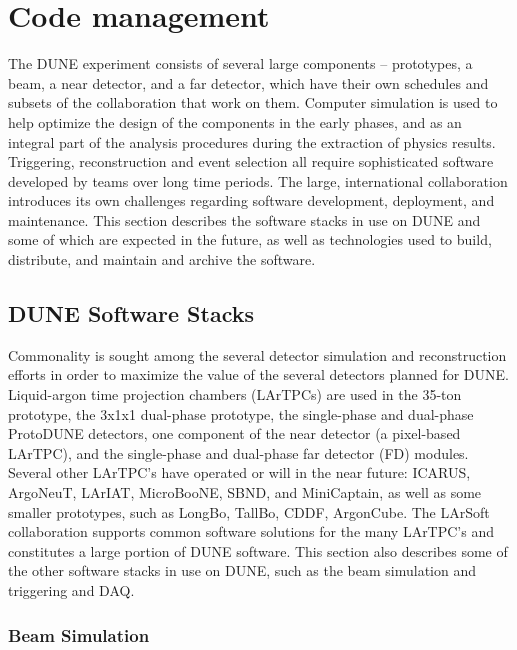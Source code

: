 %

\chapter{Code management} %
The DUNE experiment consists of several large components -- prototypes, a beam, a near detector, and a far detector,
which have their own schedules and subsets of the collaboration that work on them.  Computer simulation is used to
help optimize the design of the components in the early phases, and as an integral part of the analysis procedures
during the extraction of physics results.  Triggering, reconstruction and event selection all require sophisticated
software developed by teams over long time periods.  The large, international
collaboration introduces its own challenges regarding software development, deployment, and maintenance.
This section describes the software stacks in use on DUNE and some of which are expected in the future,
as well as technologies used to build, distribute, and maintain and archive the software.

\section{DUNE Software Stacks}

Commonality is sought among the several detector simulation and reconstruction efforts in order to maximize the
value of the several detectors planned for DUNE.  Liquid-argon time projection chambers (LArTPCs) are used in the 35-ton
prototype, the 3x1x1 dual-phase prototype, the single-phase and dual-phase ProtoDUNE detectors, 
one component of the near detector (a pixel-based
LArTPC), and the single-phase and dual-phase far detector (FD) modules.  Several other LArTPC's have operated or will
in the near future:  ICARUS, ArgoNeuT, LArIAT, MicroBooNE, SBND, and MiniCaptain, as well as some smaller prototypes,
such as LongBo, TallBo, CDDF, ArgonCube.  The LArSoft collaboration supports common software solutions for the
many LArTPC's and constitutes a large portion of DUNE software.  This section also describes some of the other
software stacks in use on DUNE, such as the beam simulation and triggering and DAQ.

\subsection{Beam Simulation}

